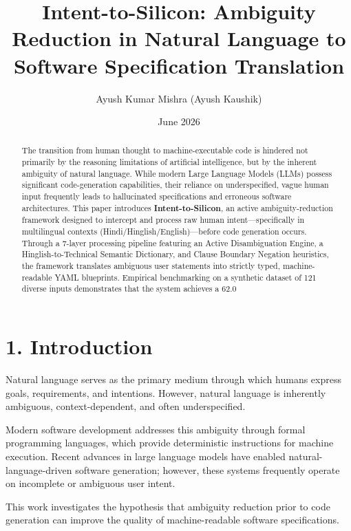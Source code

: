 \documentclass[11pt,a4paper]{article}
\title{Intent-to-Silicon: Ambiguity Reduction in Natural Language to Software Specification Translation}
\author{Ayush Kumar Mishra (Ayush Kaushik)}
\date{June 2026}
\begin{document}
\maketitle
\begin{abstract}
The transition from human thought to machine-executable code is hindered not primarily by the reasoning limitations of artificial intelligence, but by the inherent ambiguity of natural language. While modern Large Language Models (LLMs) possess significant code-generation capabilities, their reliance on underspecified, vague human input frequently leads to hallucinated specifications and erroneous software architectures. This paper introduces \textbf{Intent-to-Silicon}, an active ambiguity-reduction framework designed to intercept and process raw human intent—specifically in multilingual contexts (Hindi/Hinglish/English)—before code generation occurs. Through a 7-layer processing pipeline featuring an Active Disambiguation Engine, a Hinglish-to-Technical Semantic Dictionary, and Clause Boundary Negation heuristics, the framework translates ambiguous user statements into strictly typed, machine-readable YAML blueprints. Empirical benchmarking on a synthetic dataset of 121 diverse inputs demonstrates that the system achieves a 62.0%
\end{abstract}





\section{1. Introduction}

Natural language serves as the primary medium through which humans express goals, requirements, and intentions. However, natural language is inherently ambiguous, context-dependent, and often underspecified.

Modern software development addresses this ambiguity through formal programming languages, which provide deterministic instructions for machine execution. Recent advances in large language models have enabled natural-language-driven software generation; however, these systems frequently operate on incomplete or ambiguous user intent.

This work investigates the hypothesis that ambiguity reduction prior to code generation can improve the quality of machine-readable software specifications.
\end{document}
